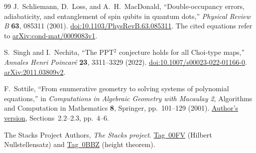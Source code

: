 \begin{thebibliography}{99}
J.~Schliemann, D.~Loss, and A.~H.~MacDonald,
``Double-occupancy errors, adiabaticity, and entanglement of spin qubits
in quantum dots,'' \emph{Physical Review B} \textbf{63}, 085311 (2001).
\href{https://doi.org/10.1103/PhysRevB.63.085311}{doi:10.1103/PhysRevB.63.085311}.
The cited equations refer to
\href{https://arxiv.org/abs/cond-mat/0009083v1}{arXiv:cond-mat/0009083v1}.

S.~Singh and I.~Nechita,
``The PPT$^2$ conjecture holds for all Choi-type maps,''
\emph{Annales Henri Poincar\'e} \textbf{23}, 3311--3329 (2022).
\href{https://doi.org/10.1007/s00023-022-01166-0}{doi:10.1007/s00023-022-01166-0}.
\href{https://arxiv.org/abs/2011.03809v2}{arXiv:2011.03809v2}.

F.~Sottile,
``From enumerative geometry to solving systems of polynomial
equations,'' in \emph{Computations in Algebraic Geometry with Macaulay 2},
Algorithms and Computation in Mathematics \textbf{8}, Springer, pp.~101--129 (2001).
\href{https://franksottile.github.io/research/pdf/M2.pdf}{Author's version},
Sections~2.2--2.3, pp.~4--6.

The Stacks Project Authors,
\emph{The Stacks project}.
\href{https://stacks.math.columbia.edu/tag/00FV}{Tag~00FV} (Hilbert
Nullstellensatz) and \href{https://stacks.math.columbia.edu/tag/0BBZ}{Tag~0BBZ}
(height theorem).

\end{thebibliography}
